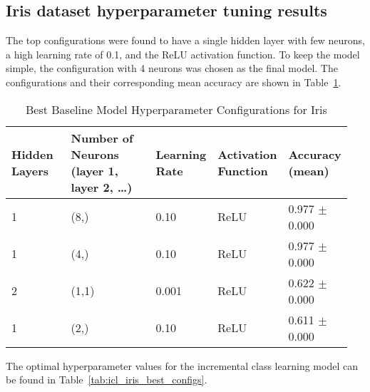 \documentclass[conference]{IEEEtran}
\begin{document}
\subsection{Iris dataset hyperparameter tuning results}
 The top configurations were found to have a single hidden layer with few neurons, a high learning rate of 0.1, and the ReLU activation function. To keep the model simple, the configuration with 4 neurons was chosen as the final model. 
 The configurations and their corresponding mean accuracy are shown in Table~\ref{tab:baseline_iris_best_configs}.
\begin{table}[H]
  \centering
  \begin{minipage}{0.85\linewidth}
    \centering
    \caption{Best Baseline Model Hyperparameter Configurations for Iris}
    \label{tab:baseline_iris_best_configs}
    \scriptsize
    \setlength{\tabcolsep}{4pt}
    \begin{tabular}{@{}p{0.19\linewidth} p{0.31\linewidth} p{0.15\linewidth} p{0.15\linewidth} p{0.15\linewidth}@{}}
      \toprule
      \shortstack{Hidden\\Layers} &
      \shortstack{Number of Neurons\\(layer 1, layer 2, \dots)} &
      \shortstack{Learning\\Rate} &
      \shortstack{Activation\\Function} &
      \shortstack{Accuracy\\(mean)} \\
      \midrule
 1 & (8,)   & 0.10  & ReLU & 0.977 $\pm$ 0.000\\
 1 & (4,)   & 0.10  & ReLU & 0.977 $\pm$ 0.000\\
 2 & (1,1)  & 0.001 & ReLU & 0.622 $\pm$ 0.000\\
 1 & (2,)   & 0.10  & ReLU & 0.611 $\pm$ 0.000\\
      \bottomrule
    \end{tabular}
  \end{minipage}
\end{table}
The optimal hyperparameter values for the incremental class learning model can be found in Table~\ref{tab:icl_iris_best_configs}. 
\end{document}
